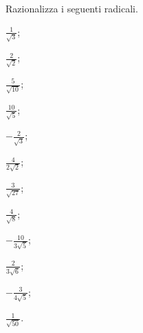 \begin{esercizio}[\Ast]
 \label{ese:2.85}
Razionalizza i seguenti radicali.
 \begin{multicols}{4}
 \begin{enumeratea}
 \item $\frac 1{\sqrt 3}$;
 \item $\frac 2{\sqrt 2}$;
 \item $\frac 5{\sqrt{10}}$;
 \item $\frac{10}{\sqrt 5}$;
 \item $-\frac 2{\sqrt 3}$;
 \item $\frac 4{2\sqrt 2}$;
 \item $\frac 3{\sqrt{27}}$;
 \item $\frac 4{\sqrt 8}$;
 \item $-\frac{10}{3\sqrt 5}$;
 \item $\frac 2{3\sqrt 6}$;
 \item $-\frac 3{4\sqrt 5}$;
 \item $\frac 1{\sqrt{50}}$.
 \end{enumeratea}
 \end{multicols}
\end{esercizio}

